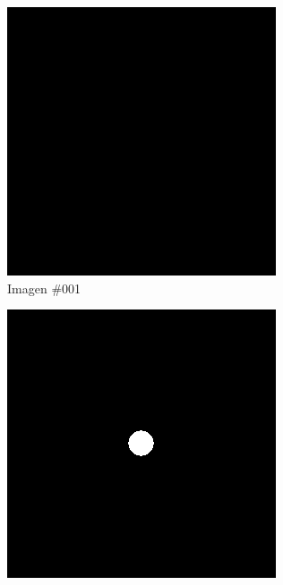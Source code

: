 \begin{figure}
\centering

	\begin{subfigure}{0.30\textwidth}
		\centering
		\includegraphics[width=\textwidth]{images/datasets/ImSphRad100/Sphere001.png}
		\caption{Imagen \#001}
		\label{f:implementacion:ImSphRad100:001}
	\end{subfigure}
	\begin{subfigure}{0.30\textwidth}
		\centering
		\includegraphics[width=\textwidth]{images/datasets/ImSphRad100/Sphere051.png}

\end{subfigure}
\end{figure}
